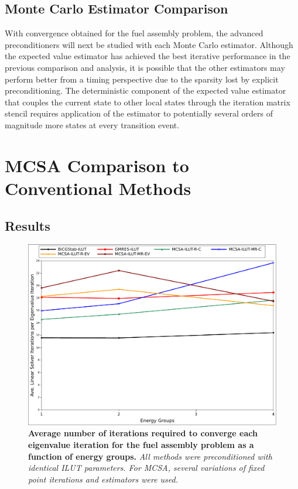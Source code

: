 \clearpage

\subsection{Monte Carlo Estimator Comparison}
\label{subsec:spn_estimator_comparison}
With convergence obtained for the fuel assembly problem, the advanced
preconditioners will next be studied with each Monte Carlo
estimator. Although the expected value estimator has achieved the best
iterative performance in the previous comparison and analysis, it is
possible that the other estimators may perform better from a timing
perspective due to the sparsity lost by explicit preconditioning. The
deterministic component of the expected value estimator that couples
the current state to other local states through the iteration matrix
stencil requires application of the estimator to potentially several
orders of magnitude more states at every transition event.

\clearpage

\section{MCSA Comparison to Conventional Methods}
\label{sec:spn_comparison}

\subsection{Results}
\label{subsec:spn_comparison_results}

\begin{figure}[t!]
  \begin{center}
    \includegraphics[width=6in]{chapters/spn_equations/solver_iters.pdf}
  \end{center}
  \caption{\textbf{Average number of iterations required to converge
      each eigenvalue iteration for the fuel assembly problem as a
      function of energy groups.} \textit{All methods were
      preconditioned with identical ILUT parameters. For MCSA, several
      variations of fixed point iterations and estimators were used.}}
  \label{fig:comparison_iterations}
\end{figure}

